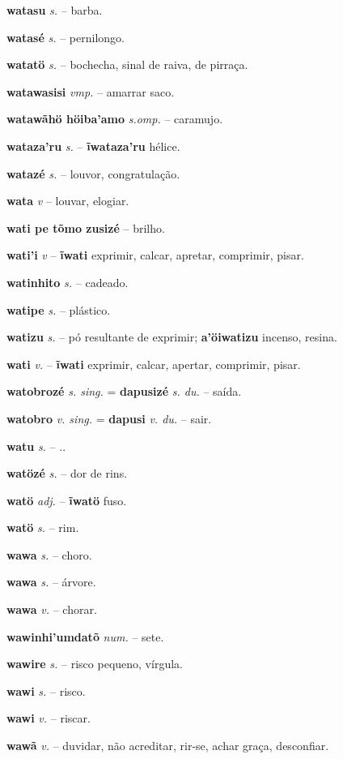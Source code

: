 \textbf{watasu} \textit{s.} -- barba.

\textbf{watasé} \textit{s.} -- pernilongo.

\textbf{watatö} \textit{s.} -- bochecha, sinal de raiva, de pirraça.

\textbf{watawasisi} \textit{vmp.} -- amarrar saco.

\textbf{watawãhö höiba'amo} \textit{s.omp.} -- caramujo.

\textbf{wataza'ru} \textit{s.} -- \textbf{ĩwataza'ru} hélice.

\textbf{watazé} \textit{s.} -- louvor, congratulação.

\textbf{wata} \textit{v} -- louvar, elogiar.

\textbf{wati pe tõmo zusizé} \textit{} -- brilho.

\textbf{wati'i} \textit{v} -- \textbf{ĩwati} exprimir, calcar, apretar, comprimir, pisar.

\textbf{watinhito} \textit{s.} -- cadeado.

\textbf{watipe} \textit{s.} -- plástico.

\textbf{watizu} \textit{s.} -- pó resultante de exprimir; \textbf{a'öiwatizu} incenso, resina.

\textbf{wati} \textit{v.} -- \textbf{ĩwati} exprimir, calcar, apertar, comprimir, pisar.

\textbf{watobrozé} \textit{s. sing.} = \textbf{dapusizé} \textit{s. du.} -- saída.

\textbf{watobro} \textit{v. sing.} = \textbf{dapusi} \textit{v. du.} -- sair.

\textbf{watu} \textit{s.} -- ..

\textbf{watözé} \textit{s.} -- dor de rins.

\textbf{watö} \textit{adj.} -- \textbf{ĩwatö} fuso.

\textbf{watö} \textit{s.} -- rim.

\textbf{wawa} \textit{s.} -- choro.

\textbf{wawa} \textit{s.} -- árvore.

\textbf{wawa} \textit{v.} -- chorar.

\textbf{wawinhi'umdatõ} \textit{num.} -- sete.

\textbf{wawire} \textit{s.} -- risco pequeno, vírgula.

\textbf{wawi} \textit{s.} -- risco.

\textbf{wawi} \textit{v.} -- riscar.

\textbf{wawã} \textit{v.} -- duvidar, não acreditar, rir-se, achar graça, desconfiar.

